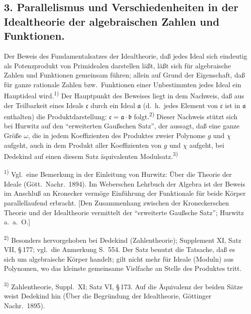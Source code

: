 \documentclass[12pt,a4paper]{article}
\begin{document}
\subsection*{3. Parallelismus und Verschiedenheiten in der Idealtheorie der algebraischen Zahlen und Funktionen.}

Der Beweis des Fundamentalsatzes der Idealtheorie, da\ss{} jedes Ideal sich eindeutig als Potenzprodukt von Primidealen darstellen l\"a\ss{}t, l\"a\ss{}t sich f\"ur algebraische Zahlen und Funktionen gemeinsam f\"uhren; allein auf Grund der Eigenschaft, da\ss{} f\"ur ganze rationale Zahlen bzw.\ Funktionen einer Unbestimmten jedes Ideal ein Hauptideal wird.\textsuperscript{1)} Der Hauptpunkt des Beweises liegt in dem Nachweis, da\ss{} aus der Teilbarkeit eines Ideals $\mathfrak{c}$ durch ein Ideal $\mathfrak{a}$ (d.\ h.\ jedes Element von $\mathfrak{c}$ ist in $\mathfrak{a}$ enthalten) die Produktdarstellung: $\mathfrak{c}=\mathfrak{a}\cdot\mathfrak{b}$ folgt.\textsuperscript{2)} Dieser Nachweis st\"utzt sich bei Hurwitz auf den ``erweiterten Gau\ss{}schen Satz'', der aussagt, da\ss{} eine ganze Gr\"o\ss{}e $\omega$, die in jedem Koeffizienten des Produktes zweier Polynome $g$ und $\chi$ aufgeht, auch in dem Produkt aller Koeffizienten von $g$ und $\chi$ aufgeht, bei Dedekind auf einen diesem Satz \"aquivalenten Modulsatz.\textsuperscript{3)}

\smallskip
\noindent\textsuperscript{1)} Vgl.\ eine Bemerkung in der Einleitung von Hurwitz: \"Uber die Theorie der Ideale (G\"ott.\ Nachr.\ 1894). Im Weberschen Lehrbuch der Algebra ist der Beweis im Anschlu\ss{} an Kronecker verm\"oge Einf\"uhrung der Funktionale f\"ur beide K\"orper parallellaufend erbracht. [Den Zusammenhang zwischen der Kroneckerschen Theorie und der Idealtheorie vermittelt der ``erweiterte Gau\ss{}sche Satz''; Hurwitz a.\ a.\ O.]

\smallskip
\noindent\textsuperscript{2)} Besonders hervorgehoben bei Dedekind (Zahlentheorie); Supplement XI, Satz VII, \S\,177; vgl.\ die Anmerkung S.\ 554. Der Satz benutzt die Tatsache, da\ss{} es sich um algebraische K\"orper handelt; gilt nicht mehr f\"ur Ideale (Moduln) aus Polynomen, wo das kleinste gemeinsame Vielfache an Stelle des Produktes tritt.

\smallskip
\noindent\textsuperscript{3)} Zahlentheorie, Suppl.\ XI; Satz VI, \S\,173. Auf die \"Aquivalenz der beiden S\"atze weist Dedekind hin (\"Uber die Begr\"undung der Idealtheorie, G\"ottinger Nachr.\ 1895).
\end{document}

